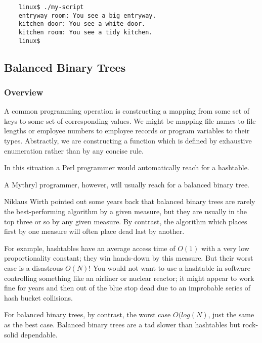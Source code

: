 \begin{verbatim}
    linux$ ./my-script
    entryway room: You see a big entryway.
    kitchen door: You see a white door.
    kitchen room: You see a tidy kitchen.
    linux$
\end{verbatim}

\cutend*


\subsection{Balanced Binary Trees}
\label{section:tut:delving-deeper:balanced-binary-trees}

\subsubsection{Overview}

A common programming operation is constructing a mapping from  
some set of keys to some set of corresponding values.  We might 
be mapping file names to file lengths or employee numbers to 
employee records or program variables to their types.  Abstractly, 
we are constructing a function which is defined by exhaustive 
enumeration rather than by any concise rule.

In this situation a Perl programmer would automatically reach for 
a hashtable.

A Mythryl programmer, however, will usually reach for a balanced 
binary tree.

Niklaus Wirth pointed out some years back that balanced binary trees 
are rarely the best-performing algorithm by a given measure, but they 
are usually in the top three or so by any given measure.  By contrast, 
the algorithm which places first by one measure will often place dead 
last by another.

For example, hashtables have an average access time of $O(1)$ with a 
very low proportionality constant;  they win hands-down by this 
measure.  But their worst case is a disastrous $O(N)$!  You would not 
want to use a hashtable in software controlling something like an 
airliner or nuclear reactor;  it might appear to work fine for years 
and then out of the blue stop dead due to an improbable series of 
hash bucket collisions.

For balanced binary trees, by contrast, the worst case $O(log(N)$, 
just the same as the best case.  Balanced binary trees are a tad 
slower than hashtables but rock-solid dependable.


